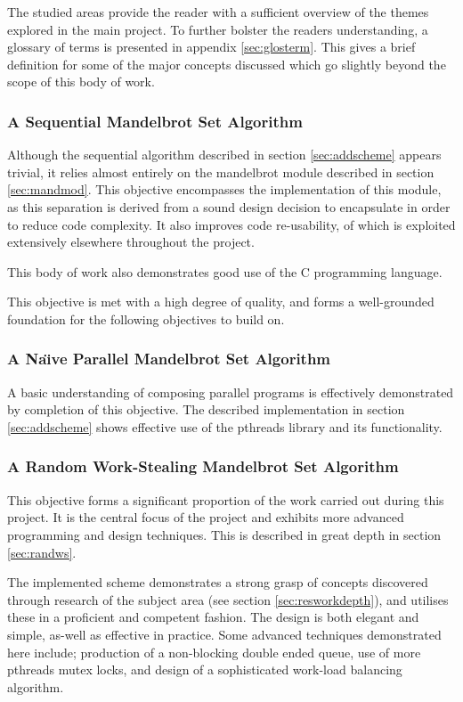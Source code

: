     The studied areas provide the reader with a sufficient overview of the themes explored in the main project. To further 
    bolster the readers understanding, a glossary of terms is presented in appendix \ref{sec:glosterm}. 
    This gives a brief definition for some of the major concepts discussed which go slightly beyond the scope of this body of work.
    
\subsubsection*{A Sequential Mandelbrot Set Algorithm}
    Although the sequential algorithm described in section \ref{sec:addscheme} appears trivial, it relies almost entirely
    on the mandelbrot module described in section \ref{sec:mandmod}. This objective encompasses the implementation of this
    module, as this separation is derived from a sound design decision to encapsulate in order to reduce code complexity. 
    It also improves code re-usability, of which is exploited extensively elsewhere throughout the project. 
    
    This body of work also demonstrates good use of the C programming language.
    
    This objective is met with a high degree of quality, and forms a well-grounded foundation for the following objectives
    to build on.
    
\subsubsection*{A Na\"{\i}ve Parallel Mandelbrot Set Algorithm}
    A basic understanding of composing parallel programs is effectively demonstrated by completion of this objective.
    The described implementation in section \ref{sec:addscheme} shows effective use of the pthreads library and its functionality. 

\subsubsection*{A Random Work-Stealing Mandelbrot Set Algorithm}
    This objective forms a significant proportion of the work carried out during this project. It is the central focus of the 
    project and exhibits more advanced programming and design techniques. 
    This is described in great depth in section \ref{sec:randws}.
    
    The implemented scheme demonstrates a strong grasp of concepts discovered through research of the subject area (see section \ref{sec:resworkdepth}),
    and utilises these in a proficient and competent fashion. The design is both elegant and simple, as-well as effective in practice.
    Some advanced techniques demonstrated here include; production of a non-blocking double ended queue, use of more pthreads mutex locks, and
    design of a sophisticated work-load balancing algorithm.

